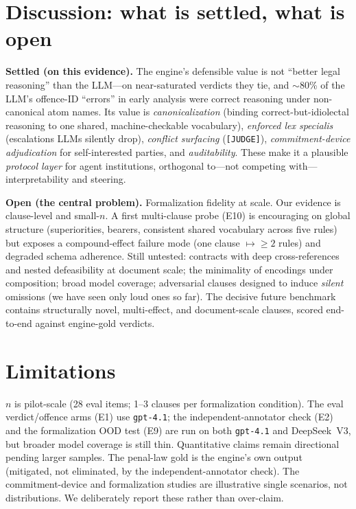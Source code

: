 \section{Discussion: what is settled, what is open}\label{sec:discussion}
\textbf{Settled (on this evidence).} The engine's defensible value is not ``better legal
reasoning'' than the LLM---on near-saturated verdicts they tie, and $\sim$80\% of the LLM's
offence-ID ``errors'' in early analysis were correct reasoning under non-canonical atom names.
Its value is \emph{canonicalization} (binding correct-but-idiolectal reasoning to one shared,
machine-checkable vocabulary), \emph{enforced lex specialis} (escalations LLMs silently drop),
\emph{conflict surfacing} (\texttt{[JUDGE]}), \emph{commitment-device adjudication} for
self-interested parties, and \emph{auditability}. These make it a plausible \emph{protocol layer}
for agent institutions, orthogonal to---not competing with---interpretability and steering.

\textbf{Open (the central problem).} Formalization fidelity at scale. Our evidence is
clause-level and small-$n$. A first multi-clause probe (E10) is encouraging on global structure
(superiorities, bearers, consistent shared vocabulary across five rules) but exposes a
compound-effect failure mode (one clause $\mapsto \geq 2$ rules) and degraded schema adherence.
Still untested: contracts with deep cross-references and nested defeasibility at document scale;
the minimality of encodings under composition; broad model coverage; adversarial clauses designed
to induce \emph{silent} omissions (we have seen only loud ones so far). The decisive future
benchmark contains structurally novel, multi-effect, and document-scale clauses, scored
end-to-end against engine-gold verdicts.

\section{Limitations}
$n$ is pilot-scale (28 eval items; 1--3 clauses per formalization condition). The eval verdict/offence arms (E1)
use \texttt{gpt-4.1}; the independent-annotator check (E2) and the formalization OOD test (E9)
are run on both \texttt{gpt-4.1} and DeepSeek~V3, but broader model coverage is still thin.
Quantitative claims remain directional pending larger samples. The penal-law gold is the
engine's own output (mitigated, not eliminated, by the independent-annotator check). The
commitment-device and formalization studies are illustrative single scenarios, not distributions.
We deliberately report these rather than over-claim.

